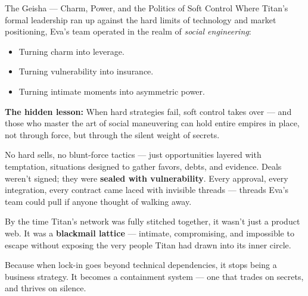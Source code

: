 \begin{HistoricalSidebar}{The Geisha --- Charm, Power, and the Politics of Soft Control}
    Where Titan’s formal leadership ran up against the hard limits of technology and market positioning, Eva’s team operated in the realm of \textit{social engineering}:

    \medskip

    \begin{itemize}
        \item Turning charm into leverage.
        \item Turning vulnerability into insurance.
        \item Turning intimate moments into asymmetric power.
    \end{itemize}
    
    \medskip
    
    \textbf{The hidden lesson:}  
    When hard strategies fail, soft control takes over —  
    and those who master the art of social maneuvering can hold entire empires in place, not through force, but through the silent weight of secrets.
    
\end{HistoricalSidebar}

\medskip


No hard sells, no blunt-force tactics — just opportunities layered with temptation, situations designed to gather favors, debts, and evidence.
Deals weren’t signed; they were \textbf{sealed with vulnerability}.
Every approval, every integration, every contract came laced with invisible threads — threads Eva’s team could pull if anyone thought of walking away.

By the time Titan’s network was fully stitched together, it wasn’t just a product web.
It was a \textbf{blackmail lattice} — intimate, compromising, and impossible to escape without exposing the very people Titan had drawn into its inner circle.

Because when lock-in goes beyond technical dependencies, it stops being a business strategy.
It becomes a containment system —
one that trades on secrets, and thrives on silence.

\medskip

